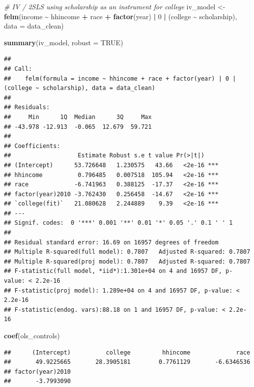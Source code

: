 \documentclass[
]{article}
\newenvironment{Shaded}{\begin{snugshade}}{\end{snugshade}}
\newcommand{\AttributeTok}[1]{\textcolor[rgb]{0.13,0.29,0.53}{#1}}
\newcommand{\CommentTok}[1]{\textcolor[rgb]{0.56,0.35,0.01}{\textit{#1}}}
\newcommand{\ConstantTok}[1]{\textcolor[rgb]{0.56,0.35,0.01}{#1}}
\newcommand{\DecValTok}[1]{\textcolor[rgb]{0.00,0.00,0.81}{#1}}
\newcommand{\FunctionTok}[1]{\textcolor[rgb]{0.13,0.29,0.53}{\textbf{#1}}}
\newcommand{\NormalTok}[1]{#1}
\newcommand{\OtherTok}[1]{\textcolor[rgb]{0.56,0.35,0.01}{#1}}
\newcommand{\SpecialCharTok}[1]{\textcolor[rgb]{0.81,0.36,0.00}{\textbf{#1}}}
\begin{document}
\begin{Shaded}
\begin{Highlighting}[]
\CommentTok{\# IV / 2SLS using scholarship as an instrument for college}
\NormalTok{iv\_model }\OtherTok{\textless{}{-}} \FunctionTok{felm}\NormalTok{(income }\SpecialCharTok{\textasciitilde{}}\NormalTok{ hhincome }\SpecialCharTok{+}\NormalTok{ race }\SpecialCharTok{+} \FunctionTok{factor}\NormalTok{(year) }\SpecialCharTok{|}
                   \DecValTok{0} \SpecialCharTok{|}
\NormalTok{                   (college }\SpecialCharTok{\textasciitilde{}}\NormalTok{ scholarship),}
                 \AttributeTok{data =}\NormalTok{ data\_clean)}

\FunctionTok{summary}\NormalTok{(iv\_model, }\AttributeTok{robust =} \ConstantTok{TRUE}\NormalTok{)}
\end{Highlighting}
\end{Shaded}

\begin{verbatim}
## 
## Call:
##    felm(formula = income ~ hhincome + race + factor(year) | 0 |      (college ~ scholarship), data = data_clean) 
## 
## Residuals:
##     Min      1Q  Median      3Q     Max 
## -43.978 -12.913  -0.065  12.679  59.721 
## 
## Coefficients:
##                   Estimate Robust s.e t value Pr(>|t|)    
## (Intercept)      53.726648   1.230575   43.66   <2e-16 ***
## hhincome          0.796485   0.007518  105.94   <2e-16 ***
## race             -6.741963   0.388125  -17.37   <2e-16 ***
## factor(year)2010 -3.762430   0.256458  -14.67   <2e-16 ***
## `college(fit)`   21.080628   2.244889    9.39   <2e-16 ***
## ---
## Signif. codes:  0 '***' 0.001 '**' 0.01 '*' 0.05 '.' 0.1 ' ' 1
## 
## Residual standard error: 16.69 on 16957 degrees of freedom
## Multiple R-squared(full model): 0.7807   Adjusted R-squared: 0.7807 
## Multiple R-squared(proj model): 0.7807   Adjusted R-squared: 0.7807 
## F-statistic(full model, *iid*):1.301e+04 on 4 and 16957 DF, p-value: < 2.2e-16 
## F-statistic(proj model): 1.289e+04 on 4 and 16957 DF, p-value: < 2.2e-16 
## F-statistic(endog. vars):88.18 on 1 and 16957 DF, p-value: < 2.2e-16
\end{verbatim}

\begin{Shaded}
\begin{Highlighting}[]
\FunctionTok{coef}\NormalTok{(ols\_controls)}
\end{Highlighting}
\end{Shaded}

\begin{verbatim}
##      (Intercept)          college         hhincome             race 
##       49.9225665       28.3905181        0.7761129       -6.6346536 
## factor(year)2010 
##       -3.7993090
\end{verbatim}
\end{document}
